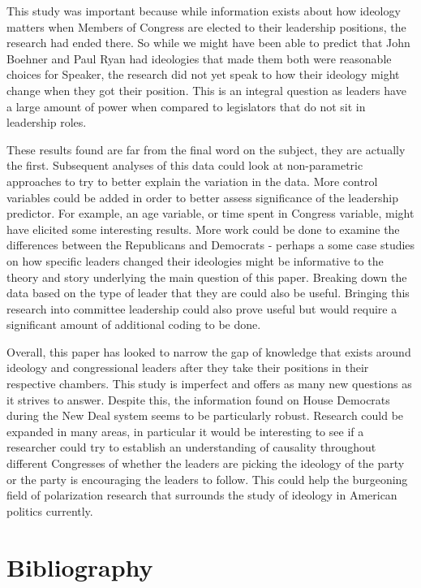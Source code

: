 \documentclass[12pt,twoside]{reedthesis}
\begin{document}
  This study was important because while information exists about how
  ideology matters when Members of Congress are elected to their
  leadership positions, the research had ended there. So while we might
  have been able to predict that John Boehner and Paul Ryan had ideologies
  that made them both were reasonable choices for Speaker, the research
  did not yet speak to how their ideology might change when they got their
  position. This is an integral question as leaders have a large amount of
  power when compared to legislators that do not sit in leadership roles.
  
  These results found are far from the final word on the subject, they are
  actually the first. Subsequent analyses of this data could look at
  non-parametric approaches to try to better explain the variation in the
  data. More control variables could be added in order to better assess
  significance of the leadership predictor. For example, an age variable,
  or time spent in Congress variable, might have elicited some interesting
  results. More work could be done to examine the differences between the
  Republicans and Democrats - perhaps a some case studies on how specific
  leaders changed their ideologies might be informative to the theory and
  story underlying the main question of this paper. Breaking down the data
  based on the type of leader that they are could also be useful. Bringing
  this research into committee leadership could also prove useful but
  would require a significant amount of additional coding to be done.
  
  Overall, this paper has looked to narrow the gap of knowledge that
  exists around ideology and congressional leaders after they take their
  positions in their respective chambers. This study is imperfect and
  offers as many new questions as it strives to answer. Despite this, the
  information found on House Democrats during the New Deal system seems to
  be particularly robust. Research could be expanded in many areas, in
  particular it would be interesting to see if a researcher could try to
  establish an understanding of causality throughout different Congresses
  of whether the leaders are picking the ideology of the party or the
  party is encouraging the leaders to follow. This could help the
  burgeoning field of polarization research that surrounds the study of
  ideology in American politics currently.
  
  \backmatter
  
  \chapter{Bibliography}\label{bibliography}
  
\end{document}

